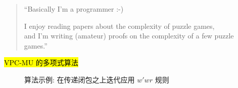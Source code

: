 \begin{frame}{}
  \begin{center}

    \pause
    \vspace{0.40cm}
    \begin{quote}
      ``Basically I'm a programmer :-)  \\[8pt] \pause

      I enjoy reading papers about the complexity of puzzle games, \\[2pt]

      and I'm writing (amateur) proofs on the complexity of a few puzzle games.''
    \end{quote}

    \pause
    \vspace{0.30cm}
  \end{center}
\end{frame}

\begin{frame}{}
  \begin{center}
    {\hl{\large VPC-MU 的多项式算法 \rwclosure{}}}
  \end{center}

  \begin{figure}[h!]
    \centering
    \begin{adjustbox}{max totalsize = {0.60\textwidth}{1.00\textheight}, center}
      
    \end{adjustbox}
    \caption{\rwclosure{} 算法示例: 在传递闭包之上迭代应用 $w'wr$ 规则}
  \end{figure}

  \vspace{-0.30cm}
\end{frame}

